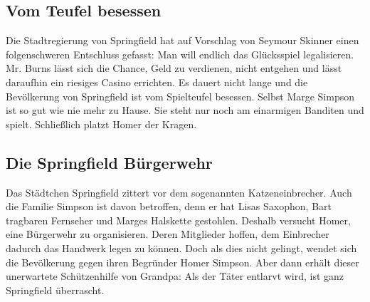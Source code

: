 	
\subsection{Vom Teufel besessen}\label{1F08}
Die Stadtregierung von Springfield hat auf Vorschlag von Seymour Skinner einen folgenschweren Entschluss gefasst: Man will endlich das Glücksspiel legalisieren. Mr. Burns lässt sich die Chance, Geld zu verdienen, nicht entgehen und lässt daraufhin ein riesiges Casino errichten. Es dauert nicht lange und die Bevölkerung von Springfield ist vom Spielteufel besessen. Selbst Marge Simpson ist so gut wie nie mehr zu Hause. Sie steht nur noch am einarmigen Banditen und spielt. Schließlich platzt Homer der Kragen.


	
\subsection{Die Springfield Bürgerwehr}\label{1F09}
Das Städtchen Springfield zittert vor dem sogenannten \glqq Katzeneinbrecher\grqq . Auch die Familie Simpson ist davon betroffen, denn er hat Lisas Saxophon, Bart tragbaren Fernseher und Marges Halskette gestohlen. Deshalb versucht Homer, eine Bürgerwehr zu organisieren. Deren Mitglieder hoffen, dem Einbrecher dadurch das Handwerk legen zu können. Doch als dies nicht gelingt, wendet sich die Bevölkerung gegen ihren Begründer Homer Simpson. Aber dann erhält dieser unerwartete Schützenhilfe von Grandpa: Als der Täter entlarvt wird, ist ganz Springfield überrascht.

